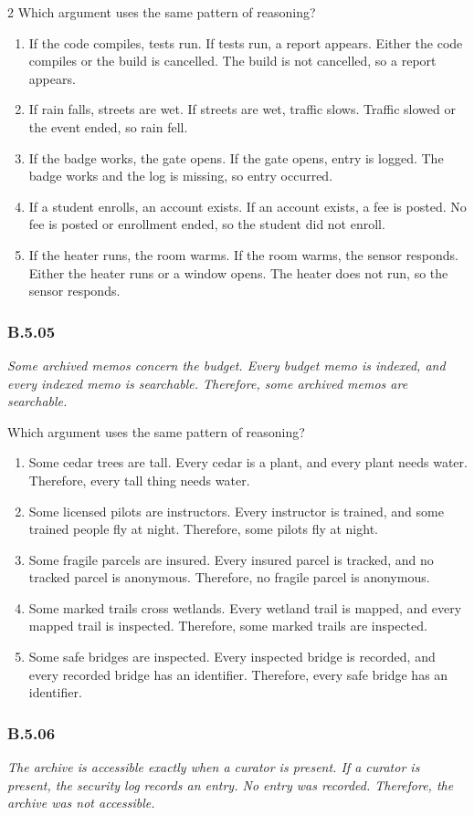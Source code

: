 \documentclass[10pt]{extarticle}
\newcommand{\choice}[1]{\item #1}
\newcommand{\bankitem}[1]{\subsubsection*{#1}}
\begin{document}
\begin{multicols}{2}
Which argument uses the same pattern of reasoning?
\begin{enumerate}[label=(\alph*)]
  \choice{If the code compiles, tests run. If tests run, a report appears. Either the code compiles or the build is cancelled. The build is not cancelled, so a report appears.}
  \choice{If rain falls, streets are wet. If streets are wet, traffic slows. Traffic slowed or the event ended, so rain fell.}
  \choice{If the badge works, the gate opens. If the gate opens, entry is logged. The badge works and the log is missing, so entry occurred.}
  \choice{If a student enrolls, an account exists. If an account exists, a fee is posted. No fee is posted or enrollment ended, so the student did not enroll.}
  \choice{If the heater runs, the room warms. If the room warms, the sensor responds. Either the heater runs or a window opens. The heater does not run, so the sensor responds.}
\end{enumerate}
\bankitem{B.5.05}
\emph{Some archived memos concern the budget. Every budget memo is indexed, and every indexed memo is searchable. Therefore, some archived memos are searchable.}

Which argument uses the same pattern of reasoning?
\begin{enumerate}[label=(\alph*)]
  \choice{Some cedar trees are tall. Every cedar is a plant, and every plant needs water. Therefore, every tall thing needs water.}
  \choice{Some licensed pilots are instructors. Every instructor is trained, and some trained people fly at night. Therefore, some pilots fly at night.}
  \choice{Some fragile parcels are insured. Every insured parcel is tracked, and no tracked parcel is anonymous. Therefore, no fragile parcel is anonymous.}
  \choice{Some marked trails cross wetlands. Every wetland trail is mapped, and every mapped trail is inspected. Therefore, some marked trails are inspected.}
  \choice{Some safe bridges are inspected. Every inspected bridge is recorded, and every recorded bridge has an identifier. Therefore, every safe bridge has an identifier.}
\end{enumerate}
\bankitem{B.5.06}
\emph{The archive is accessible exactly when a curator is present. If a curator is present, the security log records an entry. No entry was recorded. Therefore, the archive was not accessible.}


\end{multicols}
\end{document}
